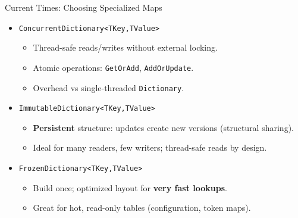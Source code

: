 \documentclass[aspectratio=169]{beamer}
\newcommand{\code}[1]{\texttt{#1}}
\begin{document}
\begin{frame}{Current Times: Choosing Specialized Maps}
  \begin{itemize}
    \item \code{ConcurrentDictionary<TKey,TValue>}
      \begin{itemize}
        \item Thread-safe reads/writes without external locking.
        \item Atomic operations: \code{GetOrAdd}, \code{AddOrUpdate}.
        \item Overhead vs single-threaded \code{Dictionary}.
      \end{itemize}
    \item \code{ImmutableDictionary<TKey,TValue>}
      \begin{itemize}
        \item \textbf{Persistent} structure: updates create new versions (structural sharing).
        \item Ideal for many readers, few writers; thread-safe reads by design.
      \end{itemize}
    \item \code{FrozenDictionary<TKey,TValue>}
      \begin{itemize}
        \item Build once; optimized layout for \textbf{very fast lookups}.
        \item Great for hot, read-only tables (configuration, token maps).
      \end{itemize}
  \end{itemize}
\end{frame}
\end{document}
